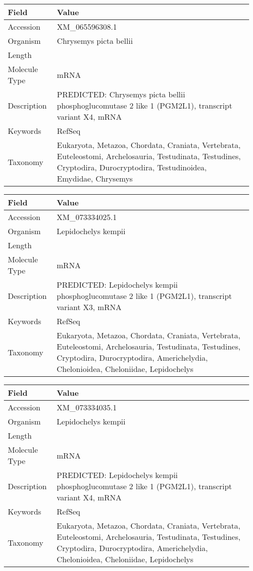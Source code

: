 \documentclass[10pt]{article}
\begin{document}
{\footnotesize
\begin{longtable}{>{\raggedright\arraybackslash}p{4.5cm} >{\raggedright\arraybackslash}p{11.5cm}}
\textbf{Field} & \textbf{Value} \\
\hline
Accession & XM\_065596308.1 \\
Organism & Chrysemys picta bellii \\
Length & 7894 \\
Molecule Type & mRNA \\
Description & PREDICTED: Chrysemys picta bellii phosphoglucomutase 2 like 1 (PGM2L1), transcript variant X4, mRNA \\
Keywords & RefSeq \\
Taxonomy & Eukaryota, Metazoa, Chordata, Craniata, Vertebrata, Euteleostomi, Archelosauria, Testudinata, Testudines, Cryptodira, Durocryptodira, Testudinoidea, Emydidae, Chrysemys \\
\end{longtable}
}

{\footnotesize
\begin{longtable}{>{\raggedright\arraybackslash}p{4.5cm} >{\raggedright\arraybackslash}p{11.5cm}}
\textbf{Field} & \textbf{Value} \\
\hline
Accession & XM\_073334025.1 \\
Organism & Lepidochelys kempii \\
Length & 7902 \\
Molecule Type & mRNA \\
Description & PREDICTED: Lepidochelys kempii phosphoglucomutase 2 like 1 (PGM2L1), transcript variant X3, mRNA \\
Keywords & RefSeq \\
Taxonomy & Eukaryota, Metazoa, Chordata, Craniata, Vertebrata, Euteleostomi, Archelosauria, Testudinata, Testudines, Cryptodira, Durocryptodira, Americhelydia, Chelonioidea, Cheloniidae, Lepidochelys \\
\end{longtable}
}

{\footnotesize
\begin{longtable}{>{\raggedright\arraybackslash}p{4.5cm} >{\raggedright\arraybackslash}p{11.5cm}}
\textbf{Field} & \textbf{Value} \\
\hline
Accession & XM\_073334035.1 \\
Organism & Lepidochelys kempii \\
Length & 1958 \\
Molecule Type & mRNA \\
Description & PREDICTED: Lepidochelys kempii phosphoglucomutase 2 like 1 (PGM2L1), transcript variant X4, mRNA \\
Keywords & RefSeq \\
Taxonomy & Eukaryota, Metazoa, Chordata, Craniata, Vertebrata, Euteleostomi, Archelosauria, Testudinata, Testudines, Cryptodira, Durocryptodira, Americhelydia, Chelonioidea, Cheloniidae, Lepidochelys \\
\end{longtable}
}
\end{document}
